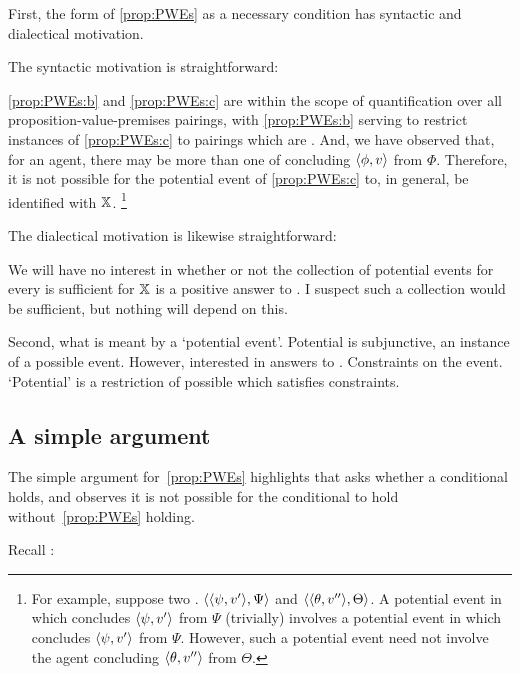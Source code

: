 \begin{note}
  First, the form of \autoref{prop:PWEs} as a necessary condition has syntactic and dialectical motivation.

  The syntactic motivation is straightforward:
  \begin{shiftpar}
    \ref{prop:PWEs:b} and \ref{prop:PWEs:c} are within the scope of quantification over all proposition-value-premises pairings, with \ref{prop:PWEs:b} serving to restrict instances of \ref{prop:PWEs:c} to pairings which are \requ{}.
    And, we have observed that, for an agent, there may be more than one \requ{} of concluding \(\pv{\phi}{v}\) from \(\Phi\).
    Therefore, it is not possible for the potential event of \ref{prop:PWEs:c} to, in general, be identified with \(\qzSaV{}\).%
    \footnote{
      For example, suppose two .
      \(\pvp{\psi}{v'}{\Psi}\) and \(\pvp{\theta}{v''}{\Theta}\).
      A potential event in which \vAgent{} concludes \(\pv{\psi}{v'}\) from \(\Psi\) (trivially) involves a potential event in which \vAgent{} concludes \(\pv{\psi}{v'}\) from \(\Psi\).
      However, such a potential event need not involve the agent concluding \(\pv{\theta}{v''}\) from \(\Theta\).
    }
  \end{shiftpar}

  The dialectical motivation is likewise straightforward:

  \begin{shiftpar}
    We will have no interest in whether or not the collection of potential events for every \requ{} is sufficient for \(\qzSaV{}\) is a positive answer to \qzS{}.
    I suspect such a collection would be sufficient, but nothing will depend on this.
  \end{shiftpar}
\end{note}

\begin{note}
  Second, what is meant by a `potential event'.
  Potential is subjunctive, an instance of a possible event.
  However, interested in answers to \qzS{}.
  Constraints on the event.
  `Potential' is a restriction of possible which satisfies constraints.
\end{note}

\subsection{A simple argument}
\label{cha:zSpA:sec:simple-argument}

\begin{note}
  The simple argument for~\autoref{prop:PWEs} highlights that \qzS{} asks whether a conditional holds, and observes it is not possible for the conditional to hold without~\autoref{prop:PWEs} holding.

  Recall \qzS{}:
  \begin{quote}
    \questionZS*
  \end{quote}
\end{note}

